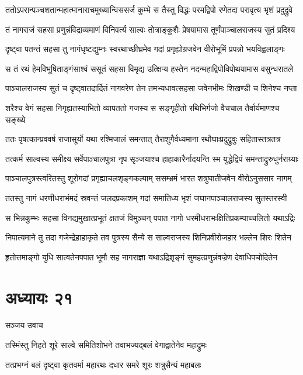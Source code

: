 \twolineshloka
{ततोऽपरान्पञ्चशतान्महात्मानाराचमुख्यान्विससर्ज कुम्भे}
{स तैस्तु विद्धः परमद्विपो रणेतदा परावृत्य भृशं प्रदुद्रुवे}


\twolineshloka
{तं नागराजं सहसा प्रणुन्नंविद्राव्यमाणं विनिवर्त्य साल्वः}
{तोत्राङ्कुशैः प्रेषयामास तूर्णंपाञ्चालराजस्य सुतं प्रदिश्य}


\twolineshloka
{दृष्ट्वा पतन्तं सहसा तु नागंधृष्टद्युम्नः स्वरथाच्छीघ्रमेव}
{गदां प्रगृह्योग्रजवेन वीरोभूमिं प्रपन्नो भयविह्वलाङ्गः}


\twolineshloka
{स तं रथं हेमविभूषिताङ्गंसाश्वं ससूतं सहसा विमृद्य}
{उत्क्षिप्य हस्तेन नदन्महाद्विपोविपोथयामास वसुन्धरातले}


\twolineshloka
{पाञ्चालराजस्य सुतं च दृष्ट्वातदार्दितं नागवरेण तेन}
{तमभ्यधावत्सहसा जवेनभीमः शिखण्डी च शिनेश्च नप्ता}


\twolineshloka
{शरैश्च वेगं सहसा निगृह्यतस्याभितो व्यापततो गजस्य}
{स सङ्गृहीतो रथिभिर्गजो वैचचाल तैर्वार्यमाणश्च सङ्ख्ये}


\twolineshloka
{ततः पृषत्कान्प्रववर्ष राजासूर्यो यथा रश्मिजालं समन्तात्}
{तैराशुगैर्वध्यमाना रथौघाःप्रदुद्रुवुः सहितास्तत्रतत्र}


\twolineshloka
{तत्कर्म साल्वस्य समीक्ष्य सर्वेपाञ्चालपुत्रा नृप सृञ्जयाश्च}
{हाहाकारैर्नादयन्ति स्म युद्धेद्विपं समन्ताद्रुरुधुर्नराग्र्याः}


\twolineshloka
{पाञ्चालपुत्रस्त्वरितस्तु शूरोगदां प्रगृह्याचलशृङ्गकल्पाम्}
{ससम्भ्रमं भारत शत्रुघातीजवेन वीरोऽनुससार नागम्}


\twolineshloka
{ततस्तु नागं धरणीधराभंमदं स्रवन्तं जलदप्रकाशम्}
{गदां समातिध्य भृशं जघानपाञ्चालराजस्य सुतस्तरस्वी}


\twolineshloka
{स भिन्नकुम्भः सहसा विनद्यमुखात्प्रभूतं क्षतजं विमुञ्चन्}
{पपात नागो धरमीधराभःक्षितिप्रकम्पाच्चलितो यथाऽद्रिः}


\twolineshloka
{निपात्यमाने तु तदा गजेन्द्रेहाहाकृते तव पुत्रस्य सैन्ये}
{स साल्वराजस्य शिनिप्रवीरोजहार भल्लेन शिरः शितेन}


\twolineshloka
{हृतोत्तमाङ्गो युधि सात्वतेनपपात भूमौ सह नागराज्ञा}
{यथाऽद्रिशृङ्गं सुमहत्प्रणुन्नंवज्रेण देवाधिपचोदितेन}


\chapter{अध्यायः २१}
\twolineshloka
{सञ्जय उवाच}
{}


\twolineshloka
{तस्मिंस्तु निहते शूरे साल्वे समितिशोभने}
{तवाभज्यद्बलं वेगाद्वातेनेव महाद्रुमः}


\twolineshloka
{तत्प्रभग्नं बलं दृष्ट्वा कृतवर्मा महारथः}
{दधार समरे शूरः शत्रुसैन्यं महाबलः}


